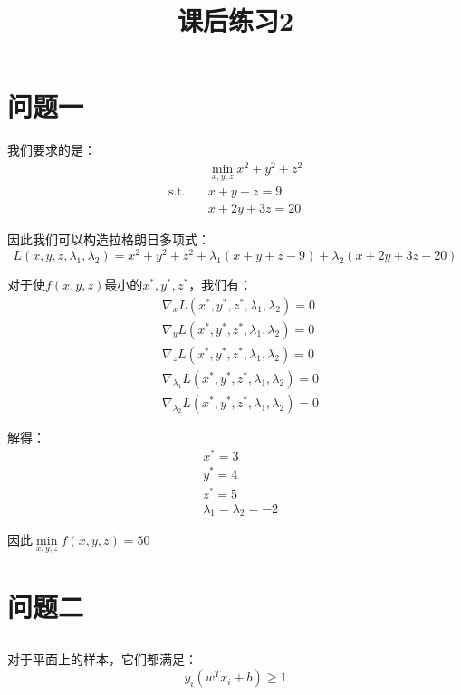 \documentclass[12pt, a4paper]{article}
\title{课后练习2}
\author{}
\date{}
\begin{document}
\maketitle %

\section{问题一}

我们要求的是：
\begin{align*}
    &\mathop{min}\limits_{x,y,z}x^2+y^2+z^2\\
    \text{s.t.} \quad & x+y+z=9\\
    &x+2y+3z=20
\end{align*}

因此我们可以构造拉格朗日多项式：
\begin{equation*}
    L(x,y,z,\lambda_1,\lambda_2)=x^2+y^2+z^2 + \lambda_1(x+y+z-9) + \lambda_2(x+2y+3z-20)
\end{equation*}

对于使$f(x,y,z)$最小的$x^*,y^*,z^*$，我们有：
\begin{align*}
    &\nabla_x L(x^*,y^*,z^*,\lambda_1,\lambda_2)=0\\
    &\nabla_y L(x^*,y^*,z^*,\lambda_1,\lambda_2)=0\\
    &\nabla_z L(x^*,y^*,z^*,\lambda_1,\lambda_2)=0\\
    &\nabla_{\lambda_1} L(x^*,y^*,z^*,\lambda_1,\lambda_2)=0\\
    &\nabla_{\lambda_2} L(x^*,y^*,z^*,\lambda_1,\lambda_2)=0
\end{align*}

解得：
\begin{align*}
    &x^*=3\\
    &y^*=4\\
    &z^*=5\\
    &\lambda_1=\lambda_2=-2
\end{align*}

因此$\mathop{min}\limits_{x,y,z}f(x,y,z)=50$


\section{问题二}


\subsection{}

对于平面上的样本，它们都满足：
\begin{equation*}
    y_i(w^T x_i+b)\geq 1
\end{equation*}
\end{document}
